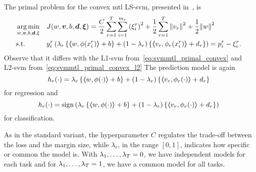 The primal problem for the convex \acrshort{mtl} LS-\acrshort{svm}, presented in~\cite{RuizAD21}, is
\begin{equation}\label{eq:svmmtl_primal_convex_ls}
    \begin{aligned}
    & \argmin_{w, \fv{v}, b, \fv{d}, \xi}
    & & {J({w}, \fv{v}, b, \fv{d}, \fv{\xi}) = \frac{C}{2} \sum_{r= 1}^T \sum_{i=1}^{m_r} \left({\xi_{i}^r}\right)^2 + \frac{1}{2} \sum_{r= 1}^T{\norm{{v}_r}^2} + \frac{1}{2} {\norm{{w}}}^2} \\
    & \text{s.t.}
    & & y_{i}^r \left(\lambda_r \left\lbrace \dotp{w}{\phi(x_{i}^r)} + b  \right\rbrace + (1 - \lambda_r) \left\lbrace \dotp{{v}_r}{\phi_r(x_{i}^r)} + d_r \right\rbrace  \right) = p_{i}^r - \xi_{i}^r .  \\
    \end{aligned}
\end{equation}
Observe that it differs with the L1-\acrshort{svm} from~\eqref{eq:svmmtl_primal_convex} and L2-\acrshort{svm} from~\eqref{eq:svmmtl_primal_convex_l2}
The prediction model is again
\begin{equation}
    \nonumber
    h_r(\cdot) = \lambda_r \left\lbrace \bm{\left\langle} w, \phi(\cdot) \bm{\right\rangle} + b  \right\rbrace + (1 - \lambda_r) \left\lbrace \bm{\left\langle} {v}_r, \phi_r(\cdot) \bm{\right\rangle} + d_r \right\rbrace
\end{equation}
for regression and 
\begin{equation}
    \nonumber
    h_r(\cdot) = \operatorname{sign}{ \left(\lambda_r \left\lbrace \bm{\left\langle} w, \phi(\cdot) \bm{\right\rangle} + b  \right\rbrace + (1 - \lambda_r) \left\lbrace \bm{\left\langle} {v}_r, \phi_r(\cdot) \bm{\right\rangle} + d_r \right\rbrace \right)}
\end{equation}
for classification.
%

As in the standard variant, the hyperparameter $C$ regulates the trade-off between the loss and the margin size, while $\lambda_r$, in the range $[0, 1]$, indicates how specific or common the model is. With $\lambda_1, \ldots, \lambda_T=0$, we have independent models for each task and for $\lambda_1, \ldots, \lambda_T=1$, we have a common model for all tasks. 
 


